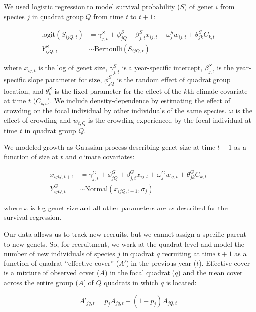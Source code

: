 \documentclass[12pt,]{article}
\begin{document}
We used logistic regression to model survival probability ($S$) of genet
$i$ from species $j$ in quadrat group $Q$ from time $t$ to $t+1$:

\begin{align}
\text{logit}(S_{ijQ,t}) &= \gamma^{S}_{j,t} + \phi^{S}_{jQ} + \beta^{S}_{j,t}x_{ij,t} + \omega^{S}_{j}w_{ij,t} + \theta^{S}_{jk}C_{k,t} \\
Y^{S}_{ijQ,t} &\sim \text{Bernoulli}(S_{ijQ,t})
\end{align}

where $x_{ij,t}$ is the log of genet size, $\gamma^{S}_{j,t}$ is a
year-specific intercept, $\beta^{S}_{j,t}$ is the year-specific slope
parameter for size, $\phi^{S}_{jQ}$ is the random effect of quadrat
group location, and $\theta^{S}_{k}$ is the fixed parameter for the
effect of the $k$th climate covariate at time $t$ ($C_{k,t}$). We
include density-dependence by estimating the effect of crowding on the
focal individual by other individuals of the same species. $\omega$ is
the effect of crowding and $w_{t,Q}$ is the crowding experienced by the
focal individual at time $t$ in quadrat group $Q$.

We modeled growth as Gaussian process describing genet size at time
$t+1$ as a function of size at $t$ and climate covariates:

\begin{align}
x_{ijQ,t+1} &= \gamma^{G}_{j,t} + \phi^{G}_{jQ} + \beta^{G}_{j,t}x_{ij,t} + \omega^{G}_{j}w_{ij,t} + \theta^{G}_{jk}C_{k,t} \\
Y^{G}_{ijQ,t} &\sim \text{Normal}(x_{ijQ,t+1}, \sigma_{j})
\end{align}

where $x$ is log genet size and all other parameters are as described
for the survival regression.

Our data allows us to track new recruits, but we cannot assign a
specific parent to new genets. So, for recruitment, we work at the
quadrat level and model the number of new individuals of species $j$ in
quadrat $q$ recruiting at time $t+1$ as a function of quadrat
``effective cover'' ($A'$) in the previous year ($t$). Effective cover
is a mixture of observed cover ($A$) in the focal quadrat ($q$) and the
mean cover across the entire group ($\bar{A}$) of $Q$ quadrats in which
$q$ is located:

\begin{equation}
A'_{jq,t} = p_{j}A_{jq,t} + (1-p_{j})\bar{A}_{jQ,t}
\end{equation}
\end{document}
